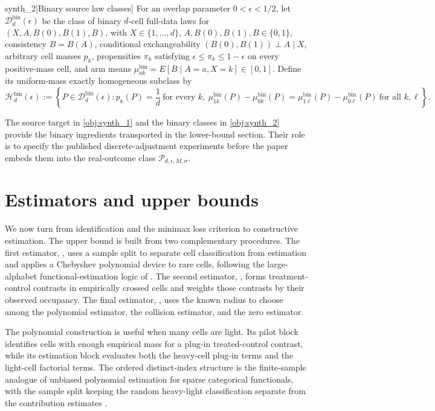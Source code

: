 \documentclass[11pt]{article}
\begin{document}
\begin{definitionv}{synth_2}[Binary source law classes]
For an overlap parameter \(0<\epsilon<1/2\), let \(\mathcal D_d^{\mathrm{bin}}(\epsilon)\) be the class of binary \(d\)-cell full-data laws for \((X,A,B(0),B(1),B)\), with \(X\in\{1,\ldots,d\}\), \(A,B(0),B(1),B\in\{0,1\}\), consistency \(B=B(A)\), conditional exchangeability \((B(0),B(1))\perp A\mid X\), arbitrary cell masses \(p_k\), propensities \(\pi_k\) satisfying \(\epsilon\le\pi_k\le1-\epsilon\) on every positive-mass cell, and arm means \(\mu_{ak}^{\mathrm{bin}}=E[B\mid A=a,X=k]\in[0,1]\). Define its uniform-mass exactly homogeneous subclass by
\[
\mathcal H_d^{\mathrm{bin}}(\epsilon)
:=
\left\{
P\in\mathcal D_d^{\mathrm{bin}}(\epsilon):
p_k(P)=\frac1d\ \text{for every }k,\ 
\mu_{1k}^{\mathrm{bin}}(P)-\mu_{0k}^{\mathrm{bin}}(P)
=
\mu_{1\ell}^{\mathrm{bin}}(P)-\mu_{0\ell}^{\mathrm{bin}}(P)
\ \text{for all }k,\ell
\right\}.
\]
\end{definitionv}

The source target in \cref{obj:synth_1} and the binary classes in \cref{obj:synth_2} provide the binary ingredients transported in the lower-bound section. Their role is to specify the published discrete-adjustment experiments before the paper embeds them into the real-outcome class \(\mathcal P_{d,\epsilon,M,\sigma}\).


\section{Estimators and upper bounds}

We now turn from identification and the minimax loss criterion to constructive estimation. The upper bound is built from two complementary procedures. The first estimator, , uses a sample split to separate cell classification from estimation and applies a Chebyshev polynomial device to rare cells, following the large-alphabet functional-estimation logic of \citet{JiaoVenkatHanWeissman2015,WuYang2016Entropy}. The second estimator, , forms treatment-control contrasts in empirically crossed cells and weights those contrasts by their observed occupancy. The final estimator, , uses the known radius to choose among the polynomial estimator, the collision estimator, and the zero estimator.

The polynomial construction is useful when many cells are light. Its pilot block identifies cells with enough empirical mass for a plug-in treated-control contrast, while its estimation block evaluates both the heavy-cell plug-in terms and the light-cell factorial terms. The ordered distinct-index structure is the finite-sample analogue of unbiased polynomial estimation for sparse categorical functionals, with the sample split keeping the random heavy-light classification separate from the contribution estimates \citep{Hoeffding1948,Serfling1980}.
\end{document}
